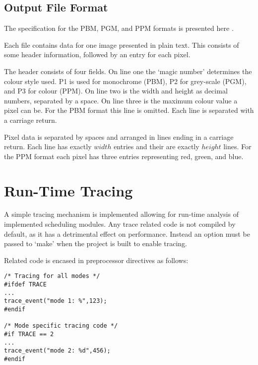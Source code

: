 

\subsection*{Output File Format}

The specification for the PBM, PGM, and PPM formats is presented here \cite{ppmspec}.

Each file contains data for one image presented in plain text. This consists of some header information, 
followed by an entry for each pixel. 

The header consists of four fields. On line one the `magic number' determines the colour style used.
P1 is used for monochrome (PBM), P2 for grey-scale (PGM), and P3 for colour (PPM).
On line two is the width and height as decimal numbers, separated by a space.
On line three is the maximum colour value a pixel can be. For the PBM format this line is omitted.
Each line is separated with a carriage return. 

Pixel data is separated by spaces and arranged in lines ending in a carriage return. 
Each line has exactly \(width\) entries and their are exactly \(height\) lines.
For the PPM format each pixel has three entries representing red, green, and blue.



\section{Run-Time Tracing}
\label{sec:traceimp}

A simple tracing mechanism is implemented allowing for run-time analysis of implemented scheduling modules.
Any trace related code is not compiled by default, as it has a detrimental effect on performance. 
Instead an option must be passed to `make' when the project is built to enable tracing.

Related code is encased in preprocessor directives as follows:

\begin{lstlisting}
/* Tracing for all modes */
#ifdef TRACE
...
trace_event("mode 1: %",123);
#endif

/* Mode specific tracing code */
#if TRACE == 2
...
trace_event("mode 2: %d",456);
#endif 
\end{lstlisting}

